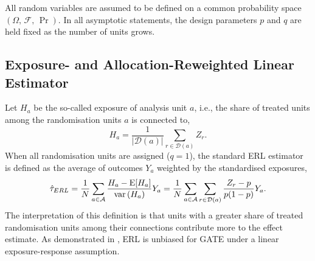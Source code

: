 \documentclass[sigconf]{acmart}
\newcounter{assumption}
\newcommand{\E}{\mathrm E}
\DeclareMathOperator{\var}{var}
\begin{document}
All random variables are assumed to be defined on a common probability space $(\Omega,\,\mathcal F,\,\Pr)$. In all asymptotic statements, the design parameters $p$ and $q$ are held fixed as the number of units grows.

\subsection{Exposure- and Allocation-Reweighted Linear Estimator}\label{subsec:estimator}

Let $H_a$ be the so-called exposure of analysis unit $a$, i.e., the share of treated units among the randomisation units $a$ is connected to,
\begin{equation}\label{eq:Ha}
    H_a = \frac{1}{|\mathcal{D}(a)|}\sum_{r\in\mathcal{D}(a)} Z_r.
\end{equation}
When all randomisation units are assigned ($q=1$), the standard ERL estimator \cite{harshaw2023erl} is defined as the average of outcomes $Y_a$ weighted by the standardised exposures,
\begin{equation}{\label{eq:erl}}
    \hat\tau_{ERL} = \frac 1 N \sum_{a\in\mathcal A} \frac{H_a - \E[H_a]}{\var \left(H_a\right)}Y_a =\frac{1}{N}\sum_{a\in\mathcal A}\sum_{r\in\mathcal{D}(a)}\frac{Z_r - p}{p(1-p)}Y_a.
\end{equation}
The interpretation of this definition is that units with a greater share of treated randomisation units among their connections contribute more to the effect estimate. As demonstrated in \cite{harshaw2023erl}, ERL is unbiased for GATE under a linear exposure-response assumption.
\end{document}
